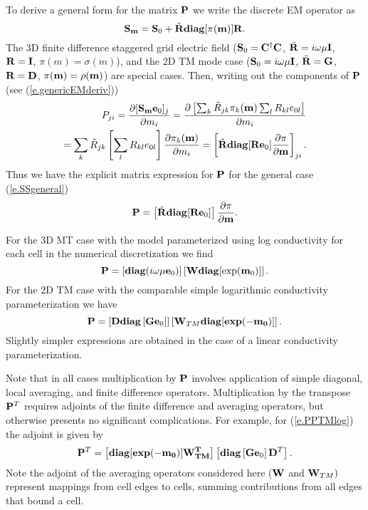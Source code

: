 To derive a general form for the matrix ${\bf P}$
we write the discrete EM operator as
\begin{equation}
\label{e.SSgeneral}
{\bf S}_{{\bf m}} = {\bf S}_0 + \tilde {{\bf R}} {\bf diag}[ \pi ({\bf m}) ] {\bf R}.
\end{equation}
The 3D finite difference staggered grid electric field  
(${\bf S}_0 = {\bf C}^{\dag}{\bf C}$, $\tilde{{\bf R}} = i\omega\mu{\bf I}$,
${\bf R} = {\bf I}$, $\pi(m) = \sigma(m)$), and the 2D TM mode case
(${\bf S}_0 = i\omega\mu{\bf I}$, $\tilde{{\bf R}} = {\bf G}$, ${\bf R} = {\bf D}$,
$\pi({\bf m}) = \rho({\bf m})$) are special cases.
Then, writing out the components of
${\bf P}$ (see (\ref{e.genericEMderiv}))
\begin{eqnarray}
\label{e.3DE_P}
P_{ji} = \frac{\partial [ {\bf S}_{{\bf m}} {\bf e}_0]_j}{\partial m_i} = 
\frac{\partial \left [ \sum_k \tilde{R}_{jk} \pi_k ({\bf m})
\sum_l R_{kl} e_{0l}\right]}{\partial{m_i}} \\
= \sum_k \tilde{R}_{jk}  \left [ \sum_l R_{kl} e_{0l}\right] \nonumber
\frac{\partial\pi_k ({\bf m})}{\partial{m_i}}
= \left[ \tilde {{\bf R}} {\bf diag} [ {\bf R} {\bf e}_0 ]
\frac{\partial \pi}{\partial {\bf m}} \right]_{ji} .
\end{eqnarray}
Thus we have the explicit matrix expression for ${\bf P}$ for the
general case (\ref{e.SSgeneral})
\begin{equation}
\label{e.PP}
{\bf P} = \left [ \tilde {{\bf R}} {\bf diag} [ {\bf R} {\bf e}_0 ] \right ]
\frac{\partial \pi}{\partial {\bf m}} .
\end{equation}

For the 3D MT case with the model parameterized
using log conductivity for each cell in the numerical
discretization we find
\begin{equation}
\label{e.PPlog}
{\bf P} = \left[ {\bf diag}(i \omega \mu {\bf e}_0) \right ]
\left [ {\bf W} {\bf diag}[\exp({\bf m}_0)] \right] .
\end{equation}
For the 2D TM case with the comparable simple logarithmic
conductivity parameterization we have
\begin{equation}
\label{e.PPTMlog}
{\bf P} = \left [ {\bf D} {\bf diag } 
\left [ {\bf G} {\bf e}_0 \right ] \right]
\left [ {\bf W}_{TM} {\bf diag}[\bf{exp}(-{\bf m}_0)] \right ] .
\end{equation}
Slightly simpler expressions are obtained in the case
of a linear conductivity parameterization.

Note that in all cases multiplication by ${\bf P}$
involves application of simple diagonal, local
averaging, and finite difference operators.
Multiplication by the transpose ${\bf P}^T$ requires
adjoints of the finite difference and averaging
operators, but otherwise presents no significant complications.
For example, for (\ref{e.PPTMlog}) the adjoint is
given by
\begin{equation}
\label{e.PPTMlogAdj}
{\bf P}^T = 
\left [ {\bf diag} [\bf{exp}(-{\bf m}_0)]
{\bf W}_{TM}^T \right] \left[
{\bf diag } \left [ {\bf G} {\bf e}_0 \right ] 
{\bf D}^T \right] . 
\end{equation}
Note the adjoint of the averaging operators
considered here (${\bf W}$ and ${\bf W}_{TM})$
represent mappings from cell edges
to cells, summing contributions from all edges that
bound a cell. 

